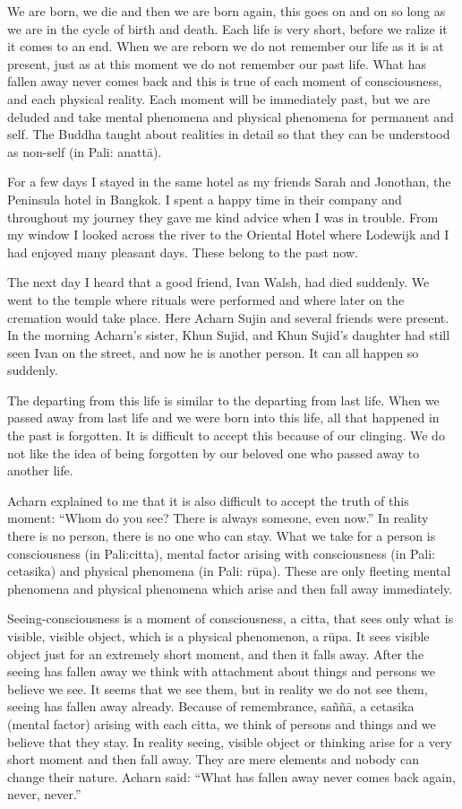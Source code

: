 We are born, we die and then we are born again, this goes on and on so
long as we are in the cycle of birth and death. Each life is very short,
before we ralize it it comes to an end. When we are reborn we do not
remember our life as it is at present, just as at this moment we do not
remember our past life. What has fallen away never comes back and this
is true of each moment of consciousness, and each physical reality. Each
moment will be immediately past, but we are deluded and take mental
phenomena and physical phenomena for permanent and self. The Buddha
taught about realities in detail so that they can be understood as
non-self (in Pali: anattā).

For a few days I stayed in the same hotel as my friends Sarah and
Jonothan, the Peninsula hotel in Bangkok. I spent a happy time in their
company and throughout my journey they gave me kind advice when I was in
trouble. From my window I looked across the river to the Oriental Hotel
where Lodewijk and I had enjoyed many pleasant days. These belong to the
past now.

The next day I heard that a good friend, Ivan Walsh, had died suddenly.
We went to the temple where rituals were performed and where later on
the cremation would take place. Here Acharn Sujin and several friends
were present. In the morning Acharn's sister, Khun Sujid, and Khun
Sujid's daughter had still seen Ivan on the street, and now he is
another person. It can all happen so suddenly.

The departing from this life is similar to the departing from last life.
When we passed away from last life and we were born into this life, all
that happened in the past is forgotten. It is difficult to accept this
because of our clinging. We do not like the idea of being forgotten by
our beloved one who passed away to another life.

Acharn explained to me that it is also difficult to accept the truth of
this moment: ``Whom do you see? There is always someone, even now.'' In
reality there is no person, there is no one who can stay. What we take
for a person is consciousness (in Pali:citta), mental factor arising
with consciousness (in Pali: cetasika) and physical phenomena (in Pali:
rūpa). These are only fleeting mental phenomena and physical phenomena
which arise and then fall away immediately.

Seeing-consciousness is a moment of consciousness, a citta, that sees
only what is visible, visible object, which is a physical phenomenon, a
rūpa. It sees visible object just for an extremely short moment, and
then it falls away. After the seeing has fallen away we think with
attachment about things and persons we believe we see. It seems that we
see them, but in reality we do not see them, seeing has fallen away
already. Because of remembrance, saññā, a cetasika (mental factor)
arising with each citta, we think of persons and things and we believe
that they stay. In reality seeing, visible object or thinking arise for
a very short moment and then fall away. They are mere elements and
nobody can change their nature. Acharn said: ``What has fallen away
never comes back again, never, never.''

